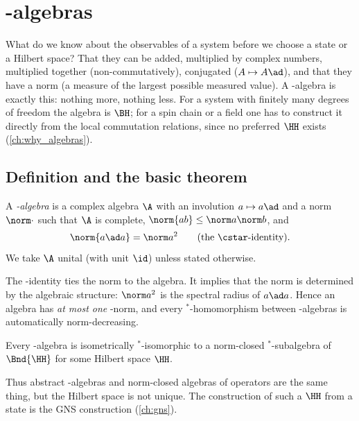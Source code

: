 \chapter{\cstar-algebras}\label{ch:cstar}

\begin{physmotiv}
What do we know about the observables of a system before we choose a state or a Hilbert space? That they can be added, multiplied by complex numbers, multiplied together (non-commutatively), conjugated ($A\mapsto A\ad$), and that they have a norm (a measure of the largest possible measured value). A \cstar-algebra is exactly this: nothing more, nothing less. For a system with finitely many degrees of freedom the algebra is $\BH$; for a spin chain or a field one has to construct it directly from the local commutation relations, since no preferred $\HH$ exists (\cref{ch:why_algebras}).
\end{physmotiv}

\section{Definition and the basic theorem}

\begin{definition}
A \emph{\cstar-algebra} is a complex algebra $\A$ with an involution $a\mapsto a\ad$ and a norm $\norm\cdot$ such that $\A$ is complete, $\norm{ab}\le\norm a\norm b$, and
\begin{equation}
\norm{a\ad a}=\norm a^2\qquad(\text{the \cstar-identity}).
\end{equation}
We take $\A$ unital (with unit $\id$) unless stated otherwise.
\end{definition}

The \cstar-identity ties the norm to the algebra. It implies that the norm is determined by the algebraic structure: $\norm a^2$ is the spectral radius of $a\ad a$. Hence an algebra has \emph{at most one} \cstar-norm, and every $^*$-homomorphism between \cstar-algebras is automatically norm-decreasing.

\begin{theorem}
Every \cstar-algebra is isometrically $^*$-isomorphic to a norm-closed $^*$-subalgebra of $\Bnd{\HH}$ for some Hilbert space $\HH$.
\end{theorem}
Thus abstract \cstar-algebras and norm-closed algebras of operators are the same thing, but the Hilbert space is not unique. The construction of such a $\HH$ from a state is the GNS construction (\cref{ch:gns}).

